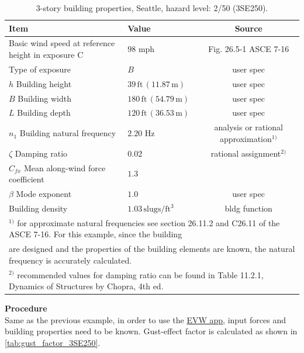 \documentclass[onecolumn, fleqn]{article}
\newcommand{\ft}{\ensuremath{\,\mathrm{ft}}}
\newcommand{\m}{\ensuremath{\,\mathrm{m}}}
\begin{document}
\begin{table}[H]
\centering \caption{3-story building properties, Seattle, hazard level: 2/50 (3SE250).}
\label{tab:prop_3SE250}
\begin{tabular}{llc}
\toprule
Item		& Value		& Source		\\
\midrule
Basic wind speed at reference height in exposure C	& 98 mph						& Fig. 26.5-1 ASCE 7-16		\\
Type of exposure									& $B$							& user spec					\\
$h$ Building height									& $39\ft \,(11.87\m)$			& user spec					\\
$B$ Building width									& $180\ft \,(54.79\m)$			& user spec					\\
$L$ Building depth									& $120\ft \,(36.53\m)$			& user spec					\\
$n_1$ Building natural frequency					& $2.20$ Hz						& analysis or rational approximation$^{1)}$\\
$\zeta$ Damping ratio								& $0.02$						& rational assignment$^{2)}$		\\
$C_{fx}$ Mean along-wind force coefficient			& $1.3$							& 							\\
$\beta$ Mode exponent								& $1.0$							& user spec					\\
Building density									& $1.03 \,\mathrm{slugs/ft^3}$	& bldg function				\\
\bottomrule
\multicolumn{3}{l}{\footnotesize $^{1)}$ for approximate natural frequencies see section 26.11.2 and C26.11 of the ASCE 7-16. For this example, since the building}	\\
\multicolumn{3}{l}{\footnotesize \hspace{3mm} are designed and the properties of the building elements are known, the natural frequency is accurately calculated.}	\\
\multicolumn{3}{l}{\footnotesize $^{2)}$ recommended values for damping ratio can be found in Table 11.2.1, Dynamics of Structures by
Chopra, 4th ed. \citep{ChopraAnilK2012Dos}}
\end{tabular}
\end{table}

\noindent\textbf{Procedure}\\
\indent Same as the previous example, in order to use the \href{https://simcenter.designsafe-ci.org/learning-tools/evw-application/}{EVW app}, input forces and building properties need to be known. Gust-effect factor is calculated as shown in \cref{tab:gust_factor_3SE250}.
\end{document}
